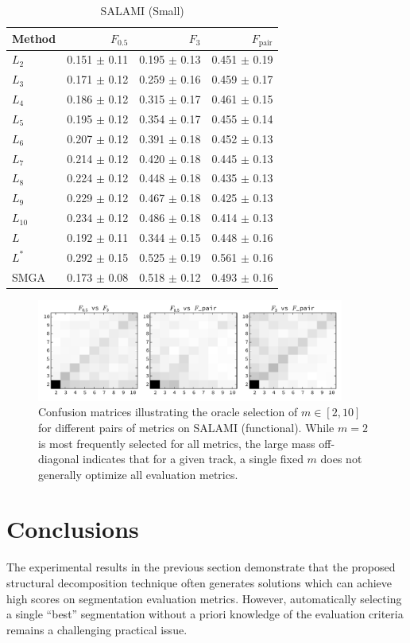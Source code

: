 \documentclass{article}
\begin{document}
\begin{table}[t]
\centering
\caption{ SALAMI (Small)\label{results:salami:small}}
\begin{tabular}{lrrr}
\toprule
Method & $F_{0.5}$ & $F_3$ & $F_\text{pair}$\\
\midrule
$L_2$   & 0.151 $\pm$ 0.11 & 0.195 $\pm$ 0.13   & 0.451 $\pm$ 0.19\\
$L_3$   & 0.171 $\pm$ 0.12 & 0.259 $\pm$ 0.16   & 0.459 $\pm$ 0.17\\
$L_4$   & 0.186 $\pm$ 0.12 & 0.315 $\pm$ 0.17   & 0.461 $\pm$ 0.15\\
$L_5$   & 0.195 $\pm$ 0.12 & 0.354 $\pm$ 0.17   & 0.455 $\pm$ 0.14\\
$L_6$   & 0.207 $\pm$ 0.12 & 0.391 $\pm$ 0.18   & 0.452 $\pm$ 0.13\\
$L_7$   & 0.214 $\pm$ 0.12 & 0.420 $\pm$ 0.18   & 0.445 $\pm$ 0.13\\
$L_8$   & 0.224 $\pm$ 0.12 & 0.448 $\pm$ 0.18   & 0.435 $\pm$ 0.13\\
$L_9$   & 0.229 $\pm$ 0.12 & 0.467 $\pm$ 0.18   & 0.425 $\pm$ 0.13\\
$L_{10}$& 0.234 $\pm$ 0.12 & 0.486 $\pm$ 0.18   & 0.414 $\pm$ 0.13\\
\midrule
$L$     & 0.192 $\pm$ 0.11 & 0.344 $\pm$ 0.15   & 0.448 $\pm$ 0.16\\
$L^*$   & 0.292 $\pm$ 0.15 & 0.525 $\pm$ 0.19   & 0.561 $\pm$ 0.16\\
\midrule
SMGA    & 0.173 $\pm$ 0.08 & 0.518 $\pm$ 0.12   & 0.493 $\pm$ 0.16\\
\bottomrule
\end{tabular}
\end{table}

\begin{figure}
\centering
\includegraphics[width=0.9\textwidth]{figs/mconfusionfunc}
\caption{Confusion matrices illustrating the oracle selection of $m\in [2, 10]$ for 
different pairs of metrics on SALAMI (functional). While $m=2$ is most frequently
selected for all metrics, the large mass off-diagonal indicates that for a given
track, a single fixed $m$ does not generally optimize all evaluation metrics.\label{mconfusion}}
\end{figure}

\section{Conclusions}
The experimental results in the previous section demonstrate that the proposed
structural decomposition technique often generates solutions which can achieve high
scores on segmentation evaluation metrics.  However, automatically selecting a single
``best'' segmentation without a priori knowledge of the evaluation criteria remains a
challenging practical issue.


\end{document}
